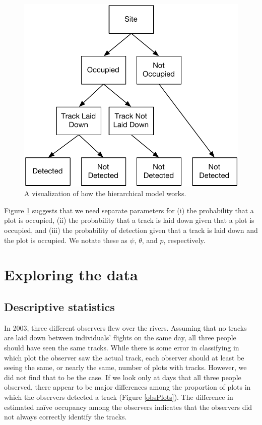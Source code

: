 \documentclass[12pt]{article}
\begin{document}
    \begin{figure}
    \begin{center}
        \includegraphics[scale=0.75]{Figures/Diagrams/SimpleHierarchicalModel}
        \caption{A visualization of how the hierarchical model works.}
        \label{simplehierarchicalmodel}
    \end{center}
    \end{figure}

    Figure \ref{simplehierarchicalmodel} suggests that we need separate
    parameters for (i) the probability that a plot is occupied, (ii) the
    probability that a track is laid
    down given that a plot is occupied, and (iii) the probability of detection
    given that a track is laid down and the plot is occupied. We notate
    these as \(\psi\), \(\theta\), and \(p\), respectively.

\section{Exploring the data}

    \subsection{Descriptive statistics}
    In 2003, three different observers flew over the rivers. Assuming that no
    tracks are laid down between individuals' flights on the same day, all three
    people should have seen the same tracks. While there is some error in
    classifying in which plot the observer saw the actual track, each observer
    should at least be seeing the same, or nearly the same, number of plots with
    tracks. However, we did not find that to be the case. If we look only at
    days that all three people observed, there appear to be major differences
    among the proportion of plots in which the observers detected a track
    (Figure \ref{obsPlots}). The difference in estimated na\"ive occupancy among
    the
    observers indicates that the observers did not always correctly identify
    the tracks.
\end{document}
